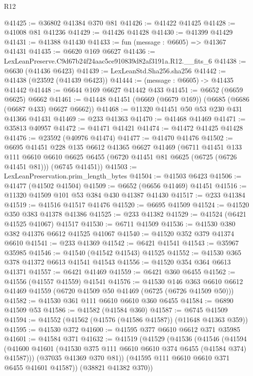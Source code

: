 \begin{lexlean}{R12}
\begin{coremodule}
@41425 := @36802 @41384 @370 @81
@41426 := @41422 @41425
@41428 := @41008 @81 @41236
@41429 := @41426 @41428
@41430 := @41399 @41429
@41431 := @41388 @41430
@41433 := fun (message : @6605) => @41367 @41431
@41435 := @6620 @169 @6627
@41436 := LexLeanPreserve.C9d67b24f24aac5ce910839d82af3191a.R12.__fits_6
@41438 := @6630 (@41436 @6423)
@41439 := LexLeanStd.Sha256.sha256
@41442 := @41438 (@23592 (@41439 @6423))
@41444 := (message : @6605) -> @41435 @41442
@41448 := @6644 @169 @6627 @41442 @433
@41451 := @6652 (@6659 @6625) @6662
@41461 := @41448 @41451 (@6669 (@6679 @169)) (@6685 (@6686 (@6687 @433) @6627 @6662))
@41468 := @11320 @41451 @50 @53 @230 @431 @41366 @41431
@41469 := @233 @41363
@41470 := @41468 @41469
@41471 := @35813 @40957
@41472 := @41471 @41421
@41474 := @41472 @41425 @41428
@41476 := @23592 (@40976 @41474)
@41477 := @41470 @41476
@41502 := @6695
    @41451
    @228
    @135
    @6612
    @41365
    @6627
    @41469
    (@6711
      @41451
      @133
      @111
      @6610
      @6610
      @6625
      @6455
      (@6720 @41451 @81 @6625 (@6725 (@6726 @41451 @81)))
      (@6745 @41451))
@41503 := LexLeanPreservation.prim_length_bytes
@41504 := @41503 @6423
@41506 := @41477 (@41502 @41504)
@41509 := @6652 (@6656 @41469) @41451
@41516 := @11320 @41509 @101 @53 @384 @430 @41387 @41430
@41517 := @233 @41384
@41519 := @41516 @41517 @41476
@41520 := @6695 @41509
@41524 := @41520 @350 @383 @41378 @41386
@41525 := @233 @41382
@41529 := @41524 (@6421 @41525 @41067) @41517
@41530 := @6711 @41509
@41536 := @41530 @380 @382 @41376 @6612 @41525 @41067
@41540 := @41520 @352 @379 @41374 @6610
@41541 := @233 @41369
@41542 := @6421 @41541
@41543 := @35967 @35985
@41546 := @41540 (@41542 @41543) @41525
@41552 := @41530 @365 @378 @41372 @6613 @41541 @41543
@41556 := @41520 @354 @364 @6613 @41371
@41557 := @6421 @41469
@41559 := @6421 @360 @6455
@41562 := @41556 (@41557 @41559) @41541
@41576 := @41530
    @146
    @363
    @6610
    @6612
    @41469
    @41559
    (@6720 @41509 @50 @41469 (@6725 (@6726 @41509 @50)))
@41582 := @41530 @361 @111 @6610 @6610 @360 @6455
@41584 := @6890 @41509 @53
@41586 := @41582 (@41584 @360)
@41587 := @6745 @41509
@41594 := @41552 (@41562 (@41576 (@41586 @41587)) (@11648 @41363 @359))
@41595 := @41530 @372
@41600 := @41595 @377 @6610 @6612 @371 @35985
@41601 := @41584 @371
@41632 := @41519
    (@41529
      (@41536
        (@41546
          (@41594 (@41600 @41601 (@41530 @375 @111 @6610 @6610 @374 @6455 (@41584 @374) @41587)))
          (@37035 @41369 @370 @81))
        (@41595 @111 @6610 @6610 @371 @6455 @41601 @41587))
      (@38821 @41382 @370))

\end{coremodule}
\end{lexlean}
